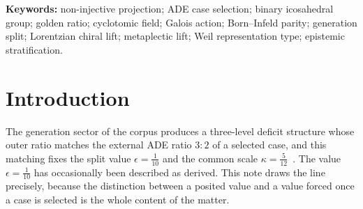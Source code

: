 \documentclass[11pt]{article}
\theoremstyle{definition}
\theoremstyle{remark}
\begin{document}
\begin{abstract}
    established here, and no conclusion on the gate is drawn.
    The extension to a recursive tower of admissible fibre operations is conditional on the same modelling premise [M]
    (completeness of the list, which implies that every admissible operation is carrier-preserving) and, for the
    central reflection, on [H-WS]: recursive non-injectivity then multiplies the vertical parity type and cannot supply
    $\sigma$.
    The Lorentzian chiral lift ($S_L\oplus S_R$, $\mathfrak{mp}(2,\mathbb{R})_{\mathbb{C}}\simeq\mathfrak{sl}_2(\mathbb{C})$)
    is an input that this note does not construct; its status is that of the spin-solder hypothesis [H-Spin] of
    Q14~\cite{Beau2026q14}, which no source supplies.
        Under [H-Spin], [H-WS], the modelling premise, the inherited central-phase convention of the chiral orientation
    note~\cite{Beau2026cho} and a further explicit premise [B] (the lift supplies, beyond the spin-stratum operations,
    only the central character and the complexification unit $\mathrm{i}$ acting by complex conjugation; this is
    asserted, not derived, and the Galois group of $K_q(\mathrm{i})$ does contain elements moving $\sqrt{5}$),
    the lift induces no action on $\mathbb{Q}(\sqrt{5})$, so that the residual spin-Galois
    caveat of that note does not arise within the present spin stratum; the overlap $\rho_\chi=1$ holds there by
    definition of $\sigma_L$, and the conclusion $N_A\neq0$ is conditional on all of these, in particular on [B].
  \end{abstract}

  \noindent\textbf{Keywords:} non-injective projection; ADE case selection; binary icosahedral group; golden ratio;
  cyclotomic field; Galois action; Born--Infeld parity; generation split; Lorentzian chiral lift; metaplectic lift;
  Weil representation type; epistemic stratification.

  \newpage
  \tableofcontents

  \newpage
  \section{Introduction}

    The generation sector of the corpus produces a three-level deficit structure whose outer ratio matches the
    external ADE ratio $3:2$ of a selected case, and this matching fixes the split value $\epsilon=\tfrac{1}{10}$ and
    the common scale $\kappa=\tfrac{5}{12}$~\cite{Beau2026q14,Beau2026a4,Beau2026bim}.
    The value $\epsilon=\tfrac{1}{10}$ has occasionally been described as derived.
    This note draws the line precisely, because the distinction between a posited value and a value forced once a case
    is selected is the whole content of the matter.
\end{document}
